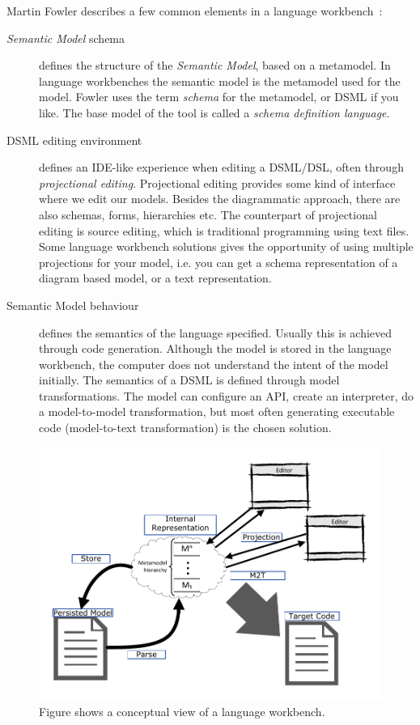 Martin Fowler describes a few common elements in a language workbench~\cite{fowler2010domain}:
\begin{description}
  \item[\emph{Semantic Model} schema] defines the structure of the \emph{Semantic Model}, based on a metamodel. In language workbenches the semantic model is the metamodel used for the model. Fowler uses the term \emph{schema} for the metamodel, or DSML if you like. The base model of the tool is called a \emph{schema definition language}.\newpage
  \item[DSML editing environment] defines an IDE-like experience when editing a DSML/DSL, often through \emph{projectional editing}.
  Projectional editing provides some kind of interface where we edit our models. Besides the diagrammatic approach, there are also schemas, forms, hierarchies etc. The counterpart of projectional editing is source editing, which is traditional programming using text files. Some language workbench solutions gives the opportunity of using multiple projections for your model, i.e. you can get a schema representation of a diagram based model, or a text representation.
  \item[Semantic Model behaviour] defines the semantics of the language specified. Usually this is achieved through code generation.
  Although the model is stored in the language workbench, the computer does not understand the intent of the model initially. The semantics of a DSML is defined through model transformations. The model can configure an API, create an interpreter, do a model-to-model transformation, but most often generating executable code (model-to-text transformation) is the chosen solution.
\end{description}

\begin{figure}[htpb]
    \centering
    \centerline{\includegraphics[scale=0.8]{images/dsml3.pdf}}
    \caption[Language workbench]{Figure shows a conceptual view of a language workbench.}
    \label{fig:dsml}
\end{figure}

